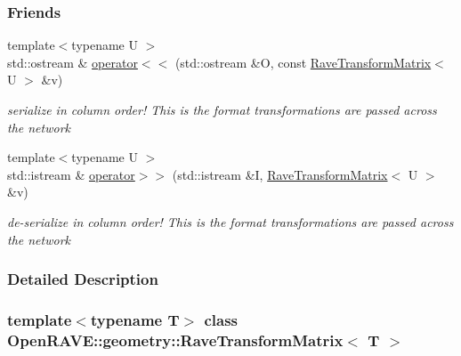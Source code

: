 \subsubsection*{Friends}
\begin{DoxyCompactItemize}
\item 
\hypertarget{classOpenRAVE_1_1geometry_1_1RaveTransformMatrix_ab5a48a63b8969c5e91ed48475fc92923}{
{\footnotesize template$<$typename U $>$ }\\std::ostream \& \hyperlink{classOpenRAVE_1_1geometry_1_1RaveTransformMatrix_ab5a48a63b8969c5e91ed48475fc92923}{operator$<$$<$} (std::ostream \&O, const \hyperlink{classOpenRAVE_1_1geometry_1_1RaveTransformMatrix}{RaveTransformMatrix}$<$ U $>$ \&v)}
\label{classOpenRAVE_1_1geometry_1_1RaveTransformMatrix_ab5a48a63b8969c5e91ed48475fc92923}

\begin{DoxyCompactList}\small\item\em serialize in column order! This is the format transformations are passed across the network \item\end{DoxyCompactList}\item 
\hypertarget{classOpenRAVE_1_1geometry_1_1RaveTransformMatrix_a07486f83f8fcc37b79f62b689a6dba1b}{
{\footnotesize template$<$typename U $>$ }\\std::istream \& \hyperlink{classOpenRAVE_1_1geometry_1_1RaveTransformMatrix_a07486f83f8fcc37b79f62b689a6dba1b}{operator$>$$>$} (std::istream \&I, \hyperlink{classOpenRAVE_1_1geometry_1_1RaveTransformMatrix}{RaveTransformMatrix}$<$ U $>$ \&v)}
\label{classOpenRAVE_1_1geometry_1_1RaveTransformMatrix_a07486f83f8fcc37b79f62b689a6dba1b}

\begin{DoxyCompactList}\small\item\em de-\/serialize in column order! This is the format transformations are passed across the network \item\end{DoxyCompactList}\end{DoxyCompactItemize}


\subsubsection{Detailed Description}
\subsubsection*{template$<$typename T$>$ class OpenRAVE::geometry::RaveTransformMatrix$<$ T $>$}

